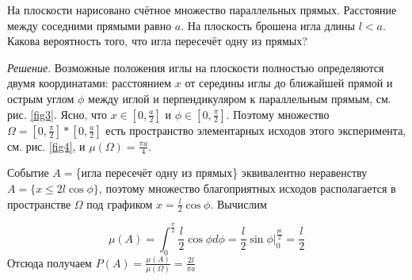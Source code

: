 \begin{example}
На плоскости нарисовано счётное множество параллельных прямых. Расстояние между соседними прямыми равно $a$. На плоскость брошена игла длины $l < a$. Какова вероятность
того, что игла пересечёт одну из прямых?

\textit{Решение}. Возможные положения иглы на плоскости полностью определяются двумя координатами: расстоянием $x$ от середины иглы до ближайшей прямой и острым углом $\phi$ между иглой и перпендикуляром к параллельным прямым, см. рис. \ref{fig3}. Ясно, что $x \in [0, \frac{a}{2} ]$ и $\phi \in [0, \frac{\pi}{2} ]$. Поэтому множество $\Omega = [0, \frac{\pi}{2}] * [0, \frac{a}{2} ]$ есть пространство элементарных исходов этого эксперимента, см. рис. \ref{fig4}, и $\mu(\Omega) = \frac{\pi a}{4}$.

Событие $A =$\{игла пересечёт одну из прямых\} эквивалентно неравенству
$A = \{x \leq 2{{l}} \cos \phi \}$, поэтому множество благоприятных исходов располагается в пространстве $\Omega$ под графиком $x = \frac{ {{l}}}{2} \cos \phi$. Вычислим

$$\mu(A)=\int_{0}^{\frac{\pi}{2}} \frac{{{l}}}{2} \cos \phi d\phi = \frac{{{l}}}{2} \sin \phi \bigg|_0^{\frac{pi}{2}} = \frac{{{l}}}{2}$$
Отсюда получаем $P(A) = \frac{\mu(A)}{\mu(\Omega)}
 = \frac{2{{l}}}{\pi a}$
\end{example}
